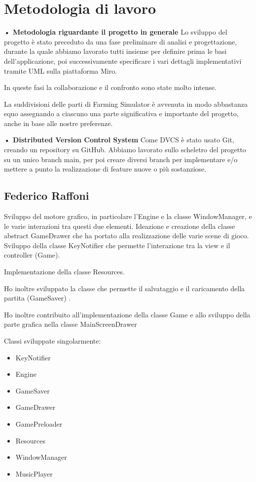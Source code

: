 \documentclass[a4paper,12pt]{report}
\begin{document}
\section{Metodologia di lavoro}

\textbf{• Metodologia riguardante il progetto in generale}\hfill\break
Lo sviluppo del progetto è stato preceduto da una fase preliminare di analisi e progettazione, durante la quale abbiamo lavorato tutti insieme per definire prima le basi dell'applicazione, poi successivamente specificare i vari dettagli implementativi tramite UML sulla piattaforma Miro.

In queste fasi la collaborazione e il confronto sono state molto intense.

La suddivisioni delle parti di Farming Simulator  è avvenuta in modo abbastanza equo assegnando a ciascuno una parte significativa e importante del progetto, anche in base alle nostre preferenze. 

\hfill\break
\textbf{• Distributed Version Control System}\hfill\break
Come DVCS è stato usato Git, creando un repository su GitHub. Abbiamo lavorato sullo scheletro del progetto su un unico branch main, per poi creare diversi branch per implementare e/o mettere a punto la realizzazione di feature nuove o più sostanziose.

\subsection{Federico Raffoni}
Sviluppo del motore grafico, in particolare l’Engine e la classe WindowManager, e le varie interazioni tra questi due elementi. Ideazione e creazione della classe abstract GameDrawer che ha portato alla realizzazione delle varie scene di gioco.  Sviluppo della classe KeyNotifier che permette l’interazione tra la view e il controller (Game).

 Implementazione della classe Resources. 
 
 Ho inoltre sviluppato la classe che permette il salvataggio e il caricamento della partita (GameSaver) .

\hfill\break
Ho inoltre contribuito all'implementazione della classe Game  e  allo sviluppo della parte grafica nella classe MainScreenDrawer 

\hfill\break
Classi sviluppate singolarmente:
{
\begin{itemize}
	\item KeyNotifier
	\item Engine
	\item GameSaver
	\item GameDrawer
	\item GamePreloader
	\item Resources
	\item WindowManager
	\item MusicPlayer
\end{itemize}
}
\end{document}

